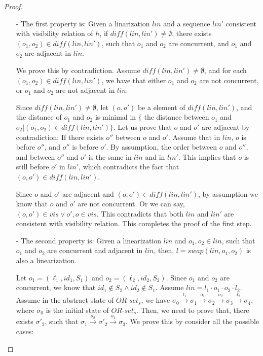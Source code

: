 {\begin {proof}
\begin{itemize}
\setlength{\itemsep}{0.5pt}
\item[-] The first property is: Given a linarization $\mathit{lin}$ and a sequence $\mathit{lin}'$ consistent with visibility relation of $h$, if $\mathit{diff}(\mathit{lin},\mathit{lin}') \neq \emptyset$, there exists $(o_1,o_2) \in \mathit{diff}(\mathit{lin},\mathit{lin}')$, such that $o_1$ and $o_2$ are concurrent, and $o_1$ and $o_2$ are adjacent in $\mathit{lin}$.

    We prove this by contradiction. Assume $\mathit{diff}(\mathit{lin},\mathit{lin}') \neq \emptyset$, and for each $(o_1,o_2) \in \mathit{diff}(\mathit{lin},\mathit{lin}')$, we have that either $o_1$ and $o_2$ are not concurrent, or $o_1$ and $o_2$ are not adjacent in $\mathit{lin}$.

    Since $\mathit{diff}(\mathit{lin},\mathit{lin}') \neq \emptyset$, let $(o,o')$ be a element of $\mathit{diff}(\mathit{lin},\mathit{lin}')$, and the distance of $o_1$ and $o_2$ is minimal in $\{$ the distance between $o_1$ and $o_2 \vert (o_1,o_2) \in \mathit{diff}(\mathit{lin},\mathit{lin}') \}$. Let us prove that $o$ and $o'$ are adjacent by contradiction: If there exists $o''$ between $o$ and $o'$. Assume that in $\mathit{lin}$, $o$ is before $o''$, and $o''$ is before $o'$. By assumption, the order between $o$ and $o''$, and between $o''$ and $o'$ is the same in $\mathit{lin}$ and in $\mathit{lin}'$. This implies that $o$ is still before $o'$ in $\mathit{lin}'$, which contradicts the fact that $(o,o') \in \mathit{diff}(\mathit{lin},\mathit{lin}')$.

    Since $o$ and $o'$ are adjacent and $(o,o') \in \mathit{diff}(\mathit{lin},\mathit{lin}')$, by assumption we know that $o$ and $o'$ are not concurrent. Or we can say, $(o,o') \in \mathit{vis} \vee \mathit{o',o} \in \mathit{vis}$. This contradicts that both $\mathit{lin}$ and $\mathit{lin}'$ are consistent with visibility relation. This completes the proof of the first step.

\item[-] The second property is: Given a linearization $\mathit{lin}$ and $o_1,o_2 \in \mathit{lin}$, such that $o_1$ and $o_2$ are concurrent and adjacent in $\mathit{lin}$, then, $l = \mathit{swap}(\mathit{lin},o_1,o_2)$ is also a linearization.

    Let $o_1 = (\ell_1,\mathit{id}_1,S_1)$ and $o_2 = (\ell_2,\mathit{id}_2,S_2)$. Since $o_1$ and $o_2$ are concurrent, we know that $\mathit{id}_1 \notin S_2 \wedge \mathit{id}_2 \notin S_1$. Assume $\mathit{lin} = l_1 \cdot o_1 \cdot o_2 \cdot l_2$. Assume in the abstract state of $\mathit{OR}$-$\mathit{set}_s$, we have $\sigma_0 {\xrightarrow{l_1}} \sigma_1 {\xrightarrow{o_1}} \sigma_2 {\xrightarrow{o_2}} \sigma_3 {\xrightarrow{l_2}} \sigma_4$, where $\sigma_0$ is the initial state of $\mathit{OR}$-$\mathit{set}_s$. Then, we need to prove that, there exists $\sigma'_2$, such that $\sigma_1 {\xrightarrow{o_2}} \sigma'_2 {\xrightarrow{o_1}} \sigma_3$. We prove this by consider all the possible cases:


\end{itemize}
\end{proof}}
